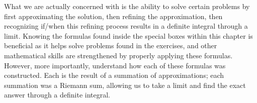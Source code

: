What we are actually concerned with is the ability to solve certain problems by first approximating the solution, then refining the approximation, then recognizing if/when this refining process results in a definite integral through a limit. Knowing the formulas found inside the special boxes within this chapter is beneficial as it helps solve problems found in the exercises, and other mathematical skills are strengthened by properly applying these formulas. However, more importantly, understand how each of these formulas was constructed. Each is the result of a summation of approximations; each summation was a Riemann sum, allowing us to take a limit and find the exact answer through a definite integral. %


